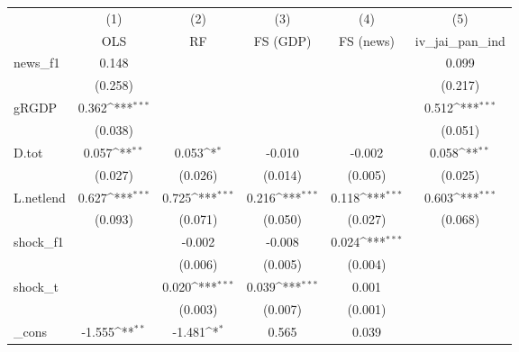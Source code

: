 {
\def\sym#1{\ifmmode^{#1}\else\(^{#1}\)\fi}
\begin{tabular}{l*{5}{c}}
\toprule
            &\multicolumn{1}{c}{(1)}&\multicolumn{1}{c}{(2)}&\multicolumn{1}{c}{(3)}&\multicolumn{1}{c}{(4)}&\multicolumn{1}{c}{(5)}\\
            &\multicolumn{1}{c}{OLS}&\multicolumn{1}{c}{RF}&\multicolumn{1}{c}{FS (GDP)}&\multicolumn{1}{c}{FS (news)}&\multicolumn{1}{c}{iv\_jai\_pan\_ind}\\
\midrule
news\_f1     &       0.148         &                     &                     &                     &       0.099         \\
            &     (0.258)         &                     &                     &                     &     (0.217)         \\
\addlinespace
gRGDP       &       0.362\sym{***}&                     &                     &                     &       0.512\sym{***}\\
            &     (0.038)         &                     &                     &                     &     (0.051)         \\
\addlinespace
D.tot       &       0.057\sym{**} &       0.053\sym{*}  &      -0.010         &      -0.002         &       0.058\sym{**} \\
            &     (0.027)         &     (0.026)         &     (0.014)         &     (0.005)         &     (0.025)         \\
\addlinespace
L.netlend   &       0.627\sym{***}&       0.725\sym{***}&       0.216\sym{***}&       0.118\sym{***}&       0.603\sym{***}\\
            &     (0.093)         &     (0.071)         &     (0.050)         &     (0.027)         &     (0.068)         \\
\addlinespace
shock\_f1    &                     &      -0.002         &      -0.008         &       0.024\sym{***}&                     \\
            &                     &     (0.006)         &     (0.005)         &     (0.004)         &                     \\
\addlinespace
shock\_t     &                     &       0.020\sym{***}&       0.039\sym{***}&       0.001         &                     \\
            &                     &     (0.003)         &     (0.007)         &     (0.001)         &                     \\
\addlinespace
\_cons      &      -1.555\sym{**} &      -1.481\sym{*}  &       0.565         &       0.039         &                     \\

\end{tabular}}
